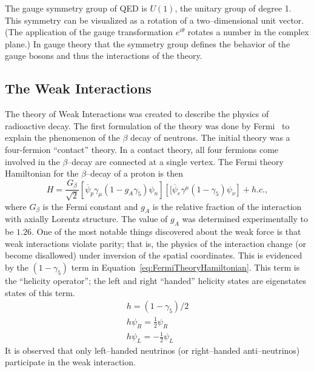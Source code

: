 The gauge symmetry group of QED is $U(1)$, the unitary group of degree 1.  This
symmetry can be visualized as a rotation of a two--dimensional unit vector. (The
application of the gauge transformation $e^{i\theta}$ rotates a number in the
complex plane.)  In gauge theory that the symmetry group
defines the behavior of the gauge bosons and thus the interactions of the
theory.  

\subsection{The Weak Interactions}
\label{sec:WeakInteractions}
The theory of Weak Interactions was created to describe the physics of
radioactive decay.  The first formulation of the theory was done by
Fermi~\cite{ref:FermiWeakInteration} to explain the phenomenon of the $\beta$
decay of neutrons. The initial theory was a four-fermion ``contact'' theory.  In
a contact theory, all four fermions come involved in the $\beta$--decay are
connected at a single vertex.  The Fermi theory Hamiltonian for the
$\beta$--decay of a proton is then~\cite{Morii:SMandBSM}
\begin{equation}
  H = \frac{G_\beta}{\sqrt{2}}
  \left[\overline \psi_p \gamma_\mu (1 - g_A\gamma_5)\psi_n\right]
  \left[[\overline \psi_e \gamma^\mu (1 - \gamma_5) \psi_\nu\right] + h.c., 
 \label{eq:FermiTheoryHamiltonian}
\end{equation}
where $G_\beta$ is the Fermi constant and $g_A$ is the relative fraction of the
interaction with axially Lorentz structure.  The value of $g_A$ was determined
experimentally to be $1.26$.  One of the most notable things discovered about
the weak force is that weak interactions violate parity; that is, the physics of
the interaction change (or become disallowed) under inversion of the spatial
coordinates.  This is evidenced by the $(1-\gamma_5)$ term in
Equation~\ref{eq:FermiTheoryHamiltonian}.  This term is the ``helicity
operator''; the left and right ``handed'' helicity states are eigenstates states
of this term.
\begin{eqnarray}
  h = (1 - \gamma_5)/2 \nonumber \\
  h\psi_R = \frac{1}{2}\psi_R \nonumber \\ 
  h\psi_L = -\frac{1}{2}\psi_L \nonumber
\end{eqnarray}
It is observed that only left--handed neutrinos (or right--handed
anti--neutrinos)  participate in the weak
interaction.

